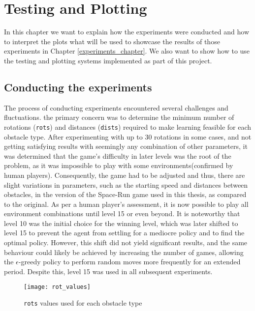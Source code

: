 \chapter{Testing and Plotting}
In this chapter we want to explain how the experiments were conducted and how to interpret the plots what will be used to showcase the results of those experiments in Chapter \ref{experiments_chapter}. We also want to show how to use the testing and plotting systems implemented as part of this project.

\section{Conducting the experiments}
The process of conducting experiments encountered several challenges and fluctuations. the primary concern was to determine the minimum number of rotations (\texttt{rots}) and distances (\texttt{dists}) required to make learning feasible for each obstacle type. After experimenting with up to 30 rotations in some cases, and not getting satisfying results with seemingly any combination of other parameters, it was determined that the game's difficulty in later levels was the root of the problem, as it was impossible to play with some environments(confirmed by human players). Consequently, the game had to be adjusted and thus, there are slight variations in parameters, such as the starting speed and distances between obstacles, in the version of the Space-Run game used in this thesis, as compared to the original. As per a human player's assessment, it is now possible to play all environment combinations until level 15 or even beyond. It is noteworthy that level 10 was the initial choice for the winning level, which was later shifted to level 15 to prevent the agent from settling for a mediocre policy and to find the optimal policy. However, this shift did not yield significant results, and the same behaviour could likely be achieved by increasing the number of games, allowing the $\epsilon$-greedy policy to perform random moves more frequently for an extended period. Despite this, level 15 was used in all subsequent experiments.

\begin{figure}[h]
    \centering
    \texttt{[image: rot\_values]}
    \caption{\texttt{rots} values used for each obstacle type}
    \label{fig:rot_values}
\end{figure}

